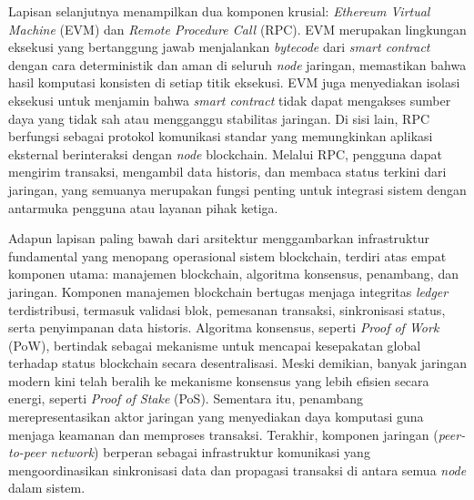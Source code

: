 Lapisan selanjutnya menampilkan dua komponen krusial: \emph{Ethereum Virtual
  Machine} (EVM) dan \emph{Remote Procedure Call} (RPC). EVM merupakan lingkungan
eksekusi yang bertanggung jawab menjalankan \emph{bytecode} dari \emph{smart
  contract} dengan cara deterministik dan aman di seluruh \emph{node} jaringan,
memastikan bahwa hasil komputasi konsisten di setiap titik eksekusi. EVM juga
menyediakan isolasi eksekusi untuk menjamin bahwa \emph{smart contract} tidak
dapat mengakses sumber daya yang tidak sah atau mengganggu stabilitas jaringan.
Di sisi lain, RPC berfungsi sebagai protokol komunikasi standar yang
memungkinkan aplikasi eksternal berinteraksi dengan \emph{node} blockchain.
Melalui RPC, pengguna dapat mengirim transaksi, mengambil data historis, dan
membaca status terkini dari jaringan, yang semuanya merupakan fungsi penting
untuk integrasi sistem dengan antarmuka pengguna atau layanan pihak ketiga.

Adapun lapisan paling bawah dari arsitektur menggambarkan infrastruktur
fundamental yang menopang operasional sistem blockchain, terdiri atas empat
komponen utama: manajemen blockchain, algoritma konsensus, penambang, dan
jaringan. Komponen manajemen blockchain bertugas menjaga integritas
\emph{ledger} terdistribusi, termasuk validasi blok, pemesanan transaksi,
sinkronisasi status, serta penyimpanan data historis. Algoritma konsensus,
seperti \emph{Proof of Work} (PoW), bertindak sebagai mekanisme untuk mencapai
kesepakatan global terhadap status blockchain secara desentralisasi. Meski
demikian, banyak jaringan modern kini telah beralih ke mekanisme konsensus yang
lebih efisien secara energi, seperti \emph{Proof of Stake} (PoS). Sementara
itu, penambang merepresentasikan aktor jaringan yang menyediakan daya komputasi
guna menjaga keamanan dan memproses transaksi. Terakhir, komponen jaringan
(\emph{peer-to-peer network}) berperan sebagai infrastruktur komunikasi yang
mengoordinasikan sinkronisasi data dan propagasi transaksi di antara semua
\emph{node} dalam sistem.

